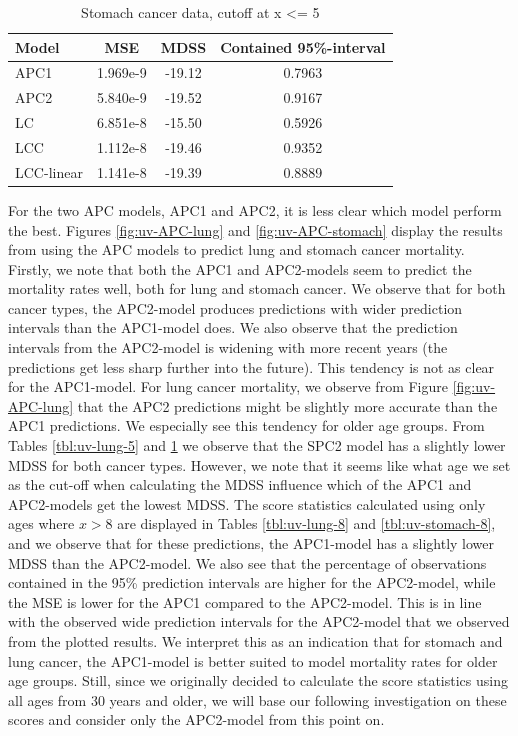 \begin{table}[h!]
    \begin{center}
        \begin{tabular}{l |c c c }
            Model & MSE &   MDSS & Contained 95\%-interval\\
            \hline
            APC1     & 1.969e-9 & -19.12    & 0.7963 \\
            APC2     & 5.840e-9 & -19.52    & 0.9167 \\
            LC      & 6.851e-8 & -15.50    & 0.5926 \\
            LCC     & 1.112e-8 & -19.46    & 0.9352 \\
            LCC-linear      & 1.141e-8 & -19.39    & 0.8889
        \end{tabular}
        \caption{Stomach cancer data, cutoff at x <= 5}\label{tbl:uv-stomach-5}
    \end{center}
\end{table}

\newpar For the two APC models, APC1 and APC2, it is less clear which model perform the best. Figures \ref{fig:uv-APC-lung} and \ref{fig:uv-APC-stomach} display the results from using the APC models to predict lung and stomach cancer mortality. Firstly, we note that both the APC1 and APC2-models seem to predict the mortality rates well, both for lung and stomach cancer. We observe that for both cancer types, the APC2-model produces predictions with wider prediction intervals than the APC1-model does. We also observe that the prediction intervals from the APC2-model is widening with more recent years (the predictions get less sharp further into the future). This tendency is not as clear for the APC1-model. For lung cancer mortality, we observe from Figure \ref{fig:uv-APC-lung} that the APC2 predictions might be slightly more accurate than the APC1 predictions. We especially see this tendency for older age groups. From Tables \ref{tbl:uv-lung-5} and \ref{tbl:uv-stomach-5} we observe that the SPC2 model has a slightly lower MDSS for both cancer types.
However, we note that it seems like what age we set as the cut-off when calculating the MDSS influence which of the APC1 and APC2-models get the lowest MDSS. The score statistics calculated using only ages where $x > 8$ are displayed in Tables \ref{tbl:uv-lung-8} and \ref{tbl:uv-stomach-8}, and we observe that for these predictions, the APC1-model has a slightly lower MDSS than the APC2-model. We also see that the percentage of observations contained in the 95\% prediction intervals are higher for the APC2-model, while the MSE is lower for the APC1 compared to the APC2-model. This is in line with the observed wide prediction intervals for the APC2-model that we observed from the plotted results. We interpret this as an indication that for stomach and lung cancer, the APC1-model is better suited to model mortality rates for older age groups. Still, since we originally decided to calculate the score statistics using all ages from 30 years and older, we will base our following investigation on these scores and consider only the APC2-model from this point on. 

